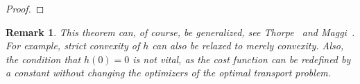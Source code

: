 \documentclass{amsart}
\theoremstyle{lemma}
\newtheorem{remark}[theorem]{Remark}
\theoremstyle{remark}
\begin{document}
\begin{proof}
\end{proof}

\begin{remark}
This theorem can, of course, be generalized, see Thorpe~\cite{thorpe} and Maggi~\cite{maggi}. For example, strict convexity of $h$ can also be relaxed to merely convexity. Also, the condition that $h(0) = 0$ is not vital, as the cost function can be redefined by a constant without changing the optimizers of the optimal transport problem.
\end{remark}
\end{document}
